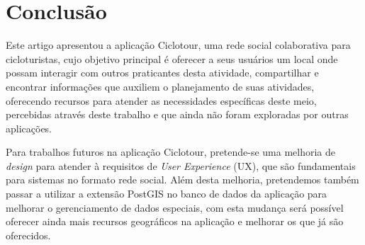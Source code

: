 \section{\esp Conclusão}
Este artigo apresentou a aplicação Ciclotour, uma rede social colaborativa para cicloturistas, cujo objetivo principal é oferecer a seus usuários 
um local onde possam interagir com outros praticantes desta atividade, compartilhar e encontrar informações que auxiliem o planejamento de suas 
atividades, oferecendo recursos para atender as necessidades específicas deste meio, percebidas através deste trabalho e que ainda não foram 
exploradas por outras aplicações.

Para trabalhos futuros na aplicação Ciclotour, pretende-se uma melhoria de \textit{design} para atender à requisitos de \textit{User Experience} (UX),
que são fundamentais para sistemas no formato rede social. Além desta melhoria, pretendemos também passar a utilizar a extensão PostGIS no banco de 
dados da aplicação para melhorar o gerenciamento de dados especiais, com esta mudança será possível oferecer ainda mais recursos geográficos na 
aplicação e melhorar os que já são oferecidos.



